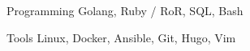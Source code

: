 

\begin{cvskills}

	\cvskill
	{Programming} %
	{Golang, Ruby / RoR, SQL, Bash} %

	\cvskill
	{Tools} %
	{Linux, Docker, Ansible, Git, Hugo, Vim} %

\end{cvskills}
